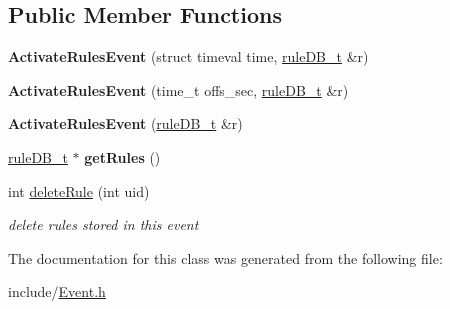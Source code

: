 \subsection*{Public Member Functions}
\begin{DoxyCompactItemize}
\item 
\mbox{\label{classActivateRulesEvent_a4f746fa6b733d0ae6cbbcec60326a131}} 
{\bfseries Activate\+Rules\+Event} (struct timeval time, \hyperlink{RuleFileParser_8h_a7d5bb94bb17a8a1d92db2a89a0cc96d1}{rule\+D\+B\+\_\+t} \&r)
\item 
\mbox{\label{classActivateRulesEvent_a2a5b8706ab54a60cbda9ce744f6cb542}} 
{\bfseries Activate\+Rules\+Event} (time\+\_\+t offs\+\_\+sec, \hyperlink{RuleFileParser_8h_a7d5bb94bb17a8a1d92db2a89a0cc96d1}{rule\+D\+B\+\_\+t} \&r)
\item 
\mbox{\label{classActivateRulesEvent_ab2a1e2d006b42902eb43952afd718e7c}} 
{\bfseries Activate\+Rules\+Event} (\hyperlink{RuleFileParser_8h_a7d5bb94bb17a8a1d92db2a89a0cc96d1}{rule\+D\+B\+\_\+t} \&r)
\item 
\mbox{\label{classActivateRulesEvent_abcf3b37831f1825f012ebe29c6013eb5}} 
\hyperlink{RuleFileParser_8h_a7d5bb94bb17a8a1d92db2a89a0cc96d1}{rule\+D\+B\+\_\+t} $\ast$ {\bfseries get\+Rules} ()
\item 
\mbox{\label{classActivateRulesEvent_ad6d8ae01bf7b38a90a05ac4eb6de94a4}} 
int \hyperlink{classActivateRulesEvent_ad6d8ae01bf7b38a90a05ac4eb6de94a4}{delete\+Rule} (int uid)
\begin{DoxyCompactList}\small\item\em delete rules stored in this event \end{DoxyCompactList}\end{DoxyCompactItemize}


The documentation for this class was generated from the following file\+:\begin{DoxyCompactItemize}
\item 
include/\hyperlink{Event_8h}{Event.\+h}\end{DoxyCompactItemize}
